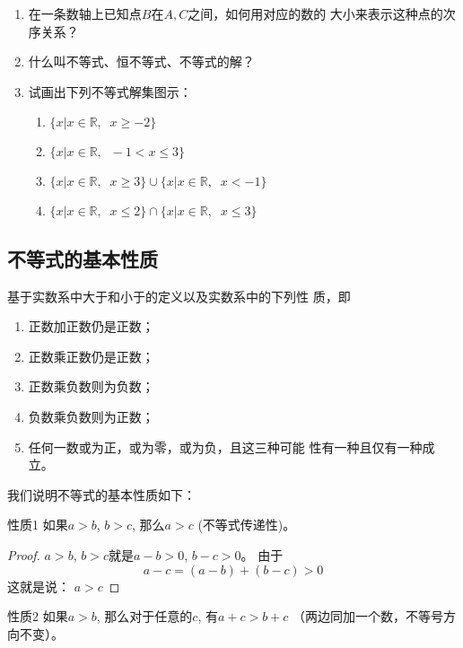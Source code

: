 \begin{ex}
    \begin{enumerate}
    \item 在一条数轴上已知点$B$在$A,C$之间，如何用对应的数的
    大小来表示这种点的次序关系？
    \item 什么叫不等式、恒不等式、不等式的解？
    \item 试画出下列不等式解集图示：
    \begin{enumerate}
        \item $\{x|x\in\mathbb{R},\;\;x\ge -2\}$
        \item $\{x|x\in\mathbb{R},\;\;-1<x\le 3\}$
        \item $\{x|x\in\mathbb{R},\;\;x\ge 3\}\cup\{x|x\in\mathbb{R},\;\; x<-1\}$
        \item $\{x|x\in\mathbb{R},\;\;x\le 2\}\cap \{x|x\in\mathbb{R},\;\; x\le 3\}$
    \end{enumerate}
    
\end{enumerate}
\end{ex}

\subsection{不等式的基本性质}
基于实数系中大于和小于的定义以及实数系中的下列性
质，即
\begin{blk}{}
\begin{enumerate}
    \item 正数加正数仍是正数；
    \item 正数乘正数仍是正数；
    \item 正数乘负数则为负数；
    \item 负数乘负数则为正数；
    \item 任何一数或为正，或为零，或为负，且这三种可能
性有一种且仅有一种成立。
\end{enumerate}
\end{blk}

我们说明不等式的基本性质如下：
\begin{blk}{性质1}
    如果$a>b$, $b>c$, 那么$a>c$ (不等式传递性)。
\end{blk}

\begin{proof}
    $a>b$, $b>c$就是$a-b>0$, $b-c>0$。
由于
$$a-c=(a-b)+(b-c)>0$$
这就是说：
$a>c$    
\end{proof}

\begin{blk}{性质2}
    如果$a>b$, 那么对于任意的$c$, 有$a+c>b+c$
（两边同加一个数，不等号方向不变）。
\end{blk}

